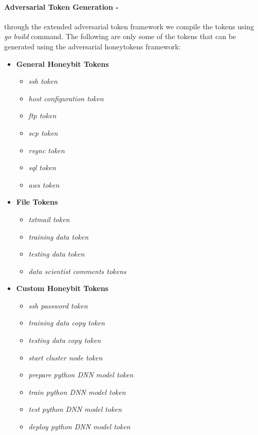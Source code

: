\documentclass[grad,lot,lof,11pt,oneside,onehalfspace]{RUthesis}
\begin{document}
\paragraph{Adversarial Token Generation -} through the extended adversarial token framework we compile the tokens using \textit{go build} command. The following are only some of the tokens that can be generated using the adversarial honeytokens framework:
\begin{itemize}
	\item \textbf{General Honeybit  Tokens}
	\begin{itemize}
		\item \textit{ssh token}
		\item \textit{host configuration token}
		\item \textit{ftp token}
		\item \textit{scp token}
		\item \textit{rsync token}
		\item \textit{sql token}
		\item \textit{aws token}
	\end{itemize}
	\item \textbf{File Tokens}
	\begin{itemize}
		\item \textit{txtmail token}
		\item \textit{training data token}
		\item \textit{testing data token}
		\item \textit{data scientist comments tokens}
	\end{itemize}
	\item \textbf{Custom Honeybit  Tokens}
	\begin{itemize}
		\item \textit{ssh password token}
		\item \textit{training data copy token}
		\item \textit{testing data copy token}
		\item \textit{start cluster node token}
		\item \textit{prepare python DNN model token}
		\item \textit{train python DNN model token}
		\item \textit{test python DNN model token}
		\item \textit{deploy python DNN model token}
	\end{itemize}
\end{itemize}
\end{document}
